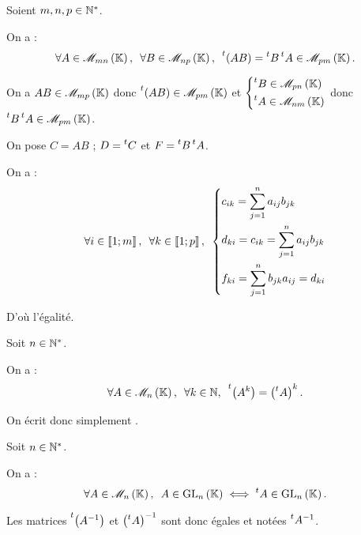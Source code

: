 \begin{prop}
Soient \(m,n,p\in\mathbb{N}^*\).

On a : \[\quantifs{\forall A\in\M{mn};\forall B\in\M{np}}\trans{\paren{AB}}=\trans{B}\trans{A}\in\M{pm}.\]
\end{prop}

\begin{dem}
On a \(AB\in\M{mp}\) donc \(\trans{\paren{AB}}\in\M{pm}\) et \(\begin{dcases}
\trans{B}\in\M{pn} \\
\trans{A}\in\M{nm}
\end{dcases}\) donc \(\trans{B}\trans{A}\in\M{pm}\).

On pose \(C=AB\) ; \(D=\prescript{t}{}{C}\) et \(F=\prescript{t}{}{B}\prescript{t}{}{A}\).

On a : \[\quantifs{\forall i\in\interventierii{1}{m};\forall k\in\interventierii{1}{p}}\begin{dcases}
c_{ik}=\sum_{j=1}^na_{ij}b_{jk} \\
d_{ki}=c_{ik}=\sum_{j=1}^na_{ij}b_{jk} \\
f_{ki}=\sum_{j=1}^nb_{jk}a_{ij}=d_{ki}
\end{dcases}\]

D'où l'égalité.
\end{dem}

\begin{cor}
Soit \(n\in\mathbb{N}^*\).

On a : \[\quantifs{\forall A\in\M{n};\forall k\in\N}\trans{\paren{A^k}}=\paren{\trans{A}}^k.\]

On écrit donc simplement .
\end{cor}

\begin{prop}
Soit \(n\in\mathbb{N}^*\).

On a : \[\quantifs{\forall A\in\M{n}}A\in\GL{n}\ssi\trans{A}\in\GL{n}.\]

Les matrices \(\prescript{t}{}{\left(A^{-1}\right)}\) et \(\left(\prescript{t}{}{A}\right)^{-1}\) sont donc égales et notées \(\prescript{t}{}{A}^{-1}\).
\end{prop}

